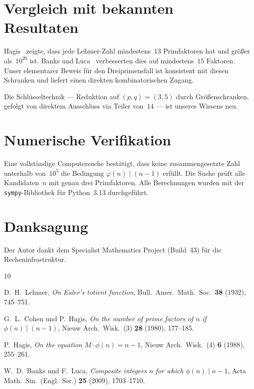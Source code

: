 \documentclass[12pt,a4paper]{amsart}
\theoremstyle{definition}
\newcommand{\euler}{\varphi}
\begin{document}
\section{Vergleich mit bekannten Resultaten}

Hagis~\cite{Hagis1988} zeigte, dass jede Lehmer-Zahl mindestens~$13$ Primfaktoren
hat und größer als~$10^{20}$ ist. Banks und Luca~\cite{Banks2009} verbesserten dies
auf mindestens~$15$ Faktoren. Unser elementarer Beweis für den Dreiprimensfall ist
konsistent mit diesen Schranken und liefert einen direkten kombinatorischen Zugang.

Die Schlüsseltechnik — Reduktion auf $(p,q) = (3,5)$ durch Größenschranken,
gefolgt von direktem Ausschluss via Teiler von~$14$ — ist unseres Wissens neu.

\section{Numerische Verifikation}

Eine vollständige Computersuche bestätigt, dass keine zusammengesetzte Zahl
unterhalb von~$10^5$ die Bedingung $\euler(n) \mid (n-1)$ erfüllt.
Die Suche prüft alle Kandidaten~$n$ mit genau drei Primfaktoren.
Alle Berechnungen wurden mit der \texttt{sympy}-Bibliothek für Python~3.13
durchgeführt.

\section*{Danksagung}

Der Autor dankt dem Specialist Mathematics Project (Build~43) für die
Recheninfrastruktur.

\begin{thebibliography}{10}

D.~H.~Lehmer,
\emph{On Euler's totient function},
Bull.\ Amer.\ Math.\ Soc.\ \textbf{38} (1932), 745--751.

G.~L.~Cohen und P.~Hagis,
\emph{On the number of prime factors of $n$ if $\phi(n) \mid (n-1)$},
Nieuw Arch.\ Wisk.\ (3) \textbf{28} (1980), 177--185.

P.~Hagis,
\emph{On the equation $M \cdot \phi(n) = n - 1$},
Nieuw Arch.\ Wisk.\ (4) \textbf{6} (1988), 255--261.

W.~D.~Banks und F.~Luca,
\emph{Composite integers $n$ for which $\phi(n) \mid n - 1$},
Acta Math.\ Sin.\ (Engl.\ Ser.) \textbf{25} (2009), 1703--1710.

\end{thebibliography}
\end{document}

